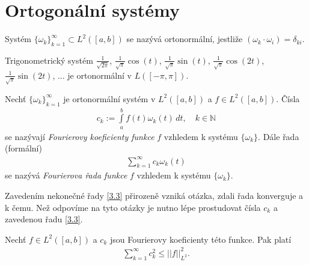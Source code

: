 \section{Ortogonální systémy}

\begin{definition}\label{3.15.definition}
Systém $\{ \omega_k \}_{k=1}^{\infty} \subset L^2([a,b])$ se nazývá ortonormální, jestliže $(\omega_k \cdot \omega_i) = \delta_{ki}$.
\end{definition}

\begin{priklad}\label{3.16.pr}
Trigonometrický systém $\frac{1}{\sqrt{2\pi}}$, $\frac{1}{\sqrt{\pi}} \cos(t)$, $\frac{1}{\sqrt{\pi}} \sin(t)$, $\frac{1}{\sqrt{\pi}} \cos (2t)$, $\frac{1}{\sqrt{\pi}} \sin (2t)$, ... je ortonormální v $L ([-\pi, \pi])$.
\end{priklad}

\begin{definition}\label{d_3.17_Fourierova_Rada}
Nechť $\{ \omega_k \}_{k=1}^{\infty}$ je ortonormální systém v $L^2([a,b])$ a $f \in L^2([a,b])$. Čísla
\begin{align*}
c_k := \int \limits_a^b f(t) \omega_k(t) \, dt, \quad k \in \mathbb{N}
\end{align*}
se nazývají \textit{Fourierovy koeficienty funkce} $f$ vzhledem k systému $\{ \omega_k \}$. Dále řada (formální)
\begin{align}\label{3.3}
\sum \limits _{k=1}^{\infty} c_k \omega_k (t)
\end{align}
se nazývá \textit{Fourierova řada funkce} $f$ vzhledem k systému $\{ \omega_k \}$.
\end{definition}
Zavedením nekonečné řady \ref{3.3} přirozeně vzniká otázka, zdali řada konverguje a k čemu. Než odpovíme na tyto otázky je nutno lépe prostudovat čísla $c_k$ a zavedenou řadu \ref{3.3}. 

\begin{theorem}
\label{v_Besselova_Nerovnost}
Nechť $f \in L^2([a,b])$ a $c_k$ jsou Fourierovy koeficienty této funkce. Pak platí
\begin{align*}
\sum \limits _{k=1}^{\infty}  c_k^2 \leq ||f||_{L^2}^2.
\end{align*}
\end{theorem}

